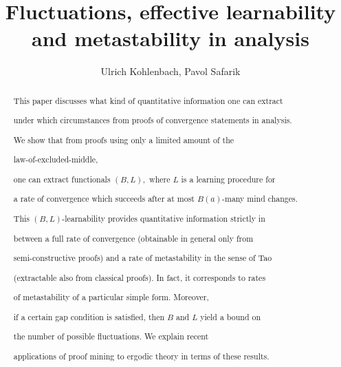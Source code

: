 \documentclass[1p]{elsarticle}
\theoremstyle{plain}
\theoremstyle{definition}
\theoremstyle{remark}
\theoremstyle{definition}
\begin{document}





\title{Fluctuations, effective learnability and metastability in analysis}

\author{Ulrich Kohlenbach, Pavol Safarik}


\address{Department of Mathematics, Technische Universit\"at Darmstadt, Schlossgartenstra{\ss}e 7, 64289 Darmstadt, Germany\\[1mm] 

Dedicated to Professor Sergei Artemov on the occasion of his 60th birthday}



\date{}



\begin{abstract}

This paper discusses what kind of quantitative information one can extract 

under which circumstances from proofs of convergence statements in analysis. 

We show that from proofs using only a limited amount of the 

law-of-excluded-middle, 

one can extract functionals $(B,L),$ where $L$ is a learning procedure for 

a rate of convergence which succeeds after at most $B(a)$-many mind changes. 

This $(B,L)$-learnability provides quantitative information strictly in 

between a full rate of convergence (obtainable in general only from 

semi-constructive proofs) and a rate of metastability in the sense of Tao 

(extractable also from classical proofs). In fact, it corresponds to rates 

of metastability of a particular simple form. Moreover, 

if a certain gap condition is satisfied, then $B$ and $L$ yield a bound on 

the number of possible fluctuations. We explain recent 

applications of proof mining to ergodic theory in terms of these results. 

\end{abstract}
\end{document}
